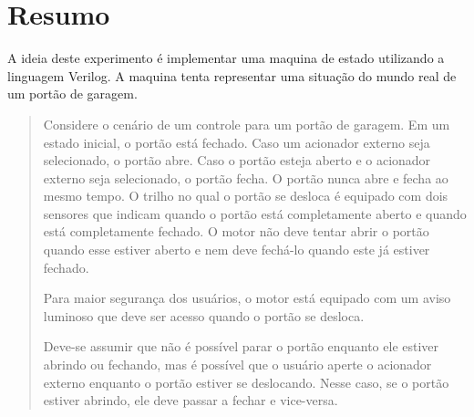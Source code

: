 \chapter{Resumo}
	A ideia deste experimento é implementar uma maquina de estado utilizando a linguagem Verilog.
	A maquina tenta representar uma situação do mundo real de um portão de garagem.

	\begin{quote}
		Considere o cenário de um controle para um portão de garagem. Em um estado inicial, o portão
		está fechado. Caso um acionador externo seja selecionado, o portão abre. Caso o portão esteja
		aberto e o acionador externo seja selecionado, o portão fecha. O portão nunca abre e fecha ao
		mesmo tempo. O trilho no qual o portão se desloca é equipado com dois sensores que indicam
		quando o portão está completamente aberto e quando está completamente fechado. O motor
		não deve tentar abrir o portão quando esse estiver aberto e nem deve fechá-lo quando este já
		estiver fechado.

		Para maior segurança dos usuários, o motor está equipado com um aviso luminoso que deve ser
		acesso quando o portão se desloca.

		Deve-se assumir que não é possível parar o portão enquanto ele estiver abrindo ou fechando,
		mas é possível que o usuário aperte o acionador externo enquanto o portão estiver se
		deslocando. Nesse caso, se o portão estiver abrindo, ele deve passar a fechar e vice-versa.
	\end{quote}

